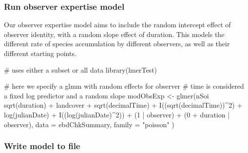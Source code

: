 \documentclass[]{article}
\newenvironment{Shaded}{}{}
\newcommand{\CommentTok}[1]{\textcolor[rgb]{0.00,0.50,0.00}{#1}}
\newcommand{\DataTypeTok}[1]{#1}
\newcommand{\DecValTok}[1]{#1}
\newcommand{\KeywordTok}[1]{\textcolor[rgb]{0.00,0.00,1.00}{#1}}
\newcommand{\NormalTok}[1]{#1}
\newcommand{\OperatorTok}[1]{#1}
\newcommand{\StringTok}[1]{\textcolor[rgb]{0.00,0.50,0.50}{#1}}
\begin{document}
\hypertarget{run-observer-expertise-model}{%
\subsubsection{Run observer expertise model}\label{run-observer-expertise-model}}

Our observer expertise model aims to include the random intercept effect of observer identity, with a random slope effect of duration. This models the different rate of species accumulation by different observers, as well as their different starting points.

\begin{Shaded}
\begin{Highlighting}[]
\CommentTok{# uses either a subset or all data}
\KeywordTok{library}\NormalTok{(lmerTest)}

\CommentTok{# here we specify a glmm with random effects for observer}
\CommentTok{# time is considered a fixed log predictor and a random slope}
\NormalTok{modObsExp <-}\StringTok{ }\KeywordTok{glmer}\NormalTok{(nSoi }\OperatorTok{~}\StringTok{ }\KeywordTok{sqrt}\NormalTok{(duration) }\OperatorTok{+}
\StringTok{  }\NormalTok{landcover }\OperatorTok{+}
\StringTok{  }\KeywordTok{sqrt}\NormalTok{(decimalTime) }\OperatorTok{+}
\StringTok{  }\KeywordTok{I}\NormalTok{((}\KeywordTok{sqrt}\NormalTok{(decimalTime))}\OperatorTok{^}\DecValTok{2}\NormalTok{) }\OperatorTok{+}
\StringTok{  }\KeywordTok{log}\NormalTok{(julianDate) }\OperatorTok{+}
\StringTok{  }\KeywordTok{I}\NormalTok{((}\KeywordTok{log}\NormalTok{(julianDate)}\OperatorTok{^}\DecValTok{2}\NormalTok{)) }\OperatorTok{+}
\StringTok{  }\NormalTok{(}\DecValTok{1} \OperatorTok{|}\StringTok{ }\NormalTok{observer) }\OperatorTok{+}\StringTok{ }\NormalTok{(}\DecValTok{0} \OperatorTok{+}\StringTok{ }\NormalTok{duration }\OperatorTok{|}\StringTok{ }\NormalTok{observer),}
\DataTypeTok{data =}\NormalTok{ ebdChkSummary, }\DataTypeTok{family =} \StringTok{"poisson"}
\NormalTok{)}
\end{Highlighting}
\end{Shaded}

\hypertarget{write-model-to-file}{%
\subsubsection{Write model to file}\label{write-model-to-file}}
\end{document}
